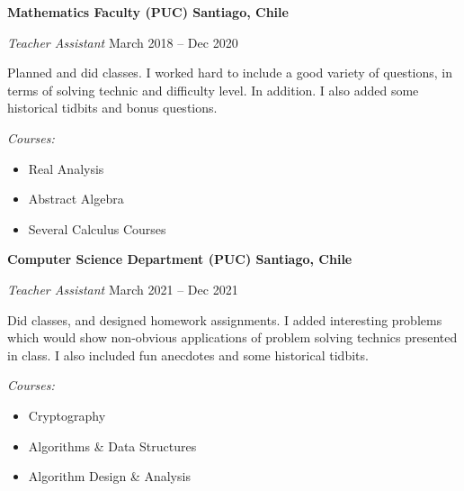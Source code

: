 \documentclass[../main.tex]{subfiles}
\begin{document}
    \textbf{Mathematics Faculty (PUC) \hfill  Santiago, Chile} \par
    \textit{Teacher Assistant} \hfill March 2018 -- Dec 2020 \par
    \vspace{5pt}
    \hspace*{1em}\begin{minipage}{\dimexpr\textwidth-4em}
        \noindent Planned and did classes. I worked hard to include a good variety of questions, in terms of solving technic and difficulty level. In addition. I also added some historical tidbits and bonus questions.\par
    \end{minipage}
    \vspace{5pt}\par
    \textit{Courses:}
    \begin{itemize}
        \item Real Analysis
        \item Abstract Algebra
        \item Several Calculus Courses
    \end{itemize} \par
    \textbf{Computer Science Department (PUC) \hfill  Santiago, Chile} \par
    \textit{Teacher Assistant} \hfill March 2021 -- Dec 2021 \par
    \vspace{5pt}
    \hspace*{1em}\begin{minipage}{\dimexpr\textwidth-4em}
        \noindent Did classes, and designed homework assignments. I added interesting problems which would show non-obvious applications of problem solving technics presented in class. I also included fun anecdotes and some historical tidbits.\par
    \end{minipage}
    \vspace{5pt}\par
    \textit{Courses:}
    \begin{itemize}
        \item Cryptography
        \item Algorithms \& Data Structures
        \item Algorithm Design \& Analysis
    \end{itemize} \par
\end{document}

